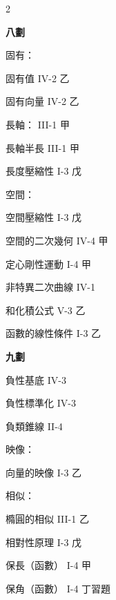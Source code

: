 \begin{multicols}{2}
\vspace{0.8em}
\begin{center}
\textbf{\large 八\quad 劃}
\end{center}

\noindent 固有：\par
\noindent\hspace*{1.5em} 固有值 \hfill IV-2 乙\par
\noindent\hspace*{1.5em} 固有向量 \hfill IV-2 乙\par
\noindent 長軸： \hfill III-1 甲\par
\noindent\hspace*{1.5em} 長軸半長 \hfill III-1 甲\par
\noindent 長度壓縮性 \hfill I-3 戊\par
\noindent 空間：\par
\noindent\hspace*{1.5em} 空間壓縮性 \hfill I-3 戊\par
\noindent\hspace*{1.5em} 空間的二次幾何 \hfill IV-4 甲\par
\noindent 定心剛性運動 \hfill I-4 甲\par
\noindent 非特異二次曲線 \hfill IV-1\par
\noindent 和化積公式 \hfill V-3 乙\par
\noindent 函數的線性條件 \hfill I-3 乙\par

\vspace{0.8em}
\begin{center}
\textbf{\large 九\quad 劃}
\end{center}

\noindent 負性基底 \hfill IV-3\par
\noindent 負性標準化 \hfill IV-3\par
\noindent 負類錐線 \hfill II-4\par
\noindent 映像：\par
\noindent\hspace*{1.5em} 向量的映像 \hfill I-3 乙\par
\noindent 相似：\par
\noindent\hspace*{1.5em} 橢圓的相似 \hfill III-1 乙\par
\noindent 相對性原理 \hfill I-3 戊\par
\noindent 保長（函數） \hfill I-4 甲\par
\noindent 保角（函數） \hfill I-4 丁習題\par


\end{multicols}
